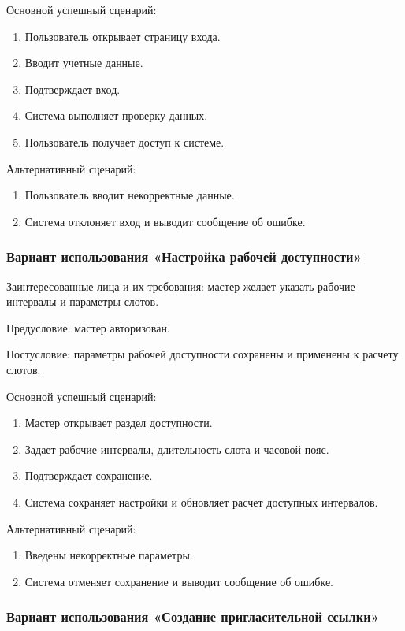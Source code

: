 Основной успешный сценарий:
\begin{enumerate}
\item Пользователь открывает страницу входа.
\item Вводит учетные данные.
\item Подтверждает вход.
\item Система выполняет проверку данных.
\item Пользователь получает доступ к системе.
\end{enumerate}

Альтернативный сценарий:
\begin{enumerate}
\item Пользователь вводит некорректные данные.
\item Система отклоняет вход и выводит сообщение об ошибке.
\end{enumerate}

\subsubsection{Вариант использования «Настройка рабочей доступности»}

Заинтересованные лица и их требования: мастер желает указать рабочие интервалы и параметры слотов.

Предусловие: мастер авторизован.

Постусловие: параметры рабочей доступности сохранены и применены к расчету слотов.

Основной успешный сценарий:
\begin{enumerate}
\item Мастер открывает раздел доступности.
\item Задает рабочие интервалы, длительность слота и часовой пояс.
\item Подтверждает сохранение.
\item Система сохраняет настройки и обновляет расчет доступных интервалов.
\end{enumerate}

Альтернативный сценарий:
\begin{enumerate}
\item Введены некорректные параметры.
\item Система отменяет сохранение и выводит сообщение об ошибке.
\end{enumerate}

\subsubsection{Вариант использования «Создание пригласительной ссылки»}

